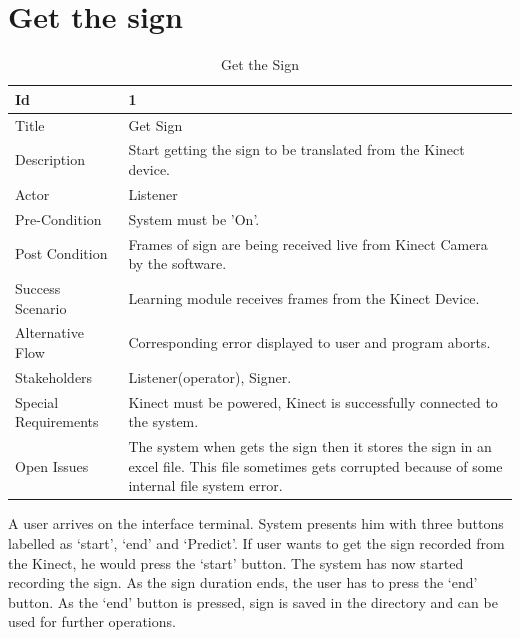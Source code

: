\section{Get the sign}
\begin{table}[htbp]
	\centering
	
	\caption{Get the Sign}
	
	\begin{tabular}{|p{3cm}|p{11cm}| } 
		\hline
		
		 Id &  1  \\ 
		\hline
		 Title &  Get Sign  \\ 
		\hline
		 Description &  Start getting the sign to be translated from the Kinect device.  \\ 
		\hline
		 Actor & Listener \\
		\hline
		 Pre-Condition & System must be 'On'.  \\ 
		\hline
		 Post Condition &  Frames of sign are being received live from Kinect Camera by the software. \\ 
		\hline
		 Success Scenario &  Learning module receives frames from the Kinect Device.  \\ 
		\hline
		 Alternative Flow &  Corresponding error displayed to user and program aborts.  \\ 
		\hline
		 Stakeholders &  Listener(operator), Signer.  \\ 
		\hline
	     Special Requirements &  Kinect must be powered, Kinect is successfully connected to the system.
		\\ 
		\hline
		 Open Issues &  The system when gets the sign then it stores the sign in an excel file. This file sometimes gets corrupted because of some internal file system error. \\ 
		\hline
	\end{tabular}  
	\clearpage        
\end{table}
A user arrives on the interface terminal. System presents him with three buttons labelled as ‘start’, ‘end’ and ‘Predict’. If user wants to get the sign recorded from the Kinect, he would press the ‘start’ button. The system has now started recording the sign. As the sign duration ends, the user has to press the ‘end’ button. As the ‘end’ button is pressed, sign is saved in the directory and can be used for further operations.

\clearpage

